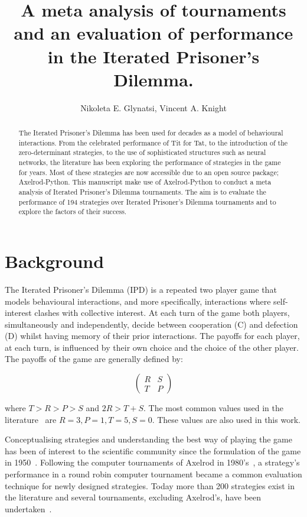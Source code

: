 \documentclass{article}
\title{A meta analysis of tournaments and an evaluation of performance in the
Iterated Prisoner's Dilemma.}
\author{Nikoleta E. Glynatsi, Vincent A. Knight}
\date{}
\newcommand{\numberofalltournaments}{}
\begin{document}
\maketitle

\begin{abstract}

The Iterated Prisoner's Dilemma has been used for decades as a model of
behavioural interactions. From the celebrated performance of Tit for Tat, to the
introduction of the zero-determinant strategies, to the use of sophisticated
structures such as neural networks, the literature has been exploring the
performance of strategies in the game for years. Most of these strategies are
now accessible due to an open source package; Axelrod-Python. This manuscript
make use of Axelrod-Python to conduct a meta analysis of Iterated Prisoner's
Dilemma tournaments. The aim is to evaluate the performance of 194 strategies
over \numberofalltournaments Iterated Prisoner's Dilemma tournaments and to
explore the factors of their success.
\end{abstract}

\section{Background}

The Iterated Prisoner's Dilemma (IPD) is a repeated two player game that models
behavioural interactions, and more specifically, interactions where
self-interest clashes with collective interest. At each turn of the game both
players, simultaneously and independently, decide between cooperation (C) and
defection (D) whilst having memory of their prior interactions. The payoffs for each
player, at each turn, is influenced by their own choice and the choice of the
other player. The payoffs of the game are generally defined by:

\[\begin{pmatrix}
R & S \\
T & P
\end{pmatrix}\]

where \(T > R > P > S\) and \(2R > T + S\). The most common values used in
the literature~\cite{Axelrod1981} are $R=3, P=1, T=5, S=0$. These values are also
used in this work.

Conceptualising strategies and understanding the best way of playing the game
has been of interest to the scientific community since the formulation of the
game in 1950~\cite{Flood1958}. Following the computer tournaments of Axelrod in
1980's~\cite{Axelrod1980a, Axelrod1980b}, a strategy's performance in a round
robin computer tournament became a common evaluation technique for newly designed
strategies. Today more than 200 strategies exist in the literature and several
tournaments, excluding Axelrod's, have been undertaken~\cite{Bendor1991,
Harper2017, Kendall2007, Stephens2002, Stewart2012}.
\end{document}
